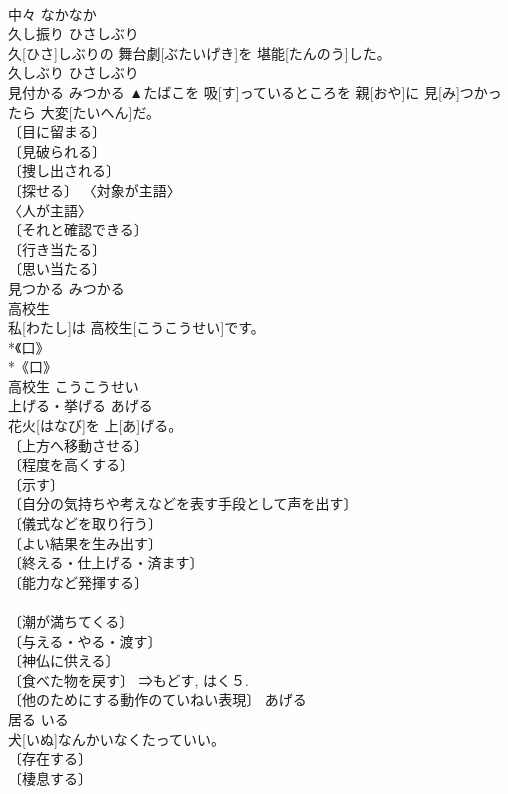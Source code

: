 \documentclass[8pt]{extreport}
\begin{document}
\begin{CJK}{UTF8}{min}
\\	中々	なかなか	
\\	久し振り	ひさしぶり	
\\	久[ひさ]しぶりの 舞台劇[ぶたいげき]を 堪能[たんのう]した。	
\\	久しぶり	ひさしぶり	
\\	見付かる	みつかる	▲たばこを 吸[す]っているところを 親[おや]に 見[み]つかったら 大変[たいへん]だ。	
\\	〔目に留まる〕 
\\	〔見破られる〕 
\\	〔捜し出される〕 
\\	〔探せる〕 〈対象が主語〉 
\\	〈人が主語〉 
\\	〔それと確認できる〕 
\\	〔行き当たる〕 
\\	〔思い当たる〕 
\\	見つかる	みつかる	
\\	高校生		
\\	私[わたし]は 高校生[こうこうせい]です。	
\\	*《口》 
\\	*《口》 
\\	高校生	こうこうせい	
\\	上げる・挙げる	あげる	
\\	花火[はなび]を 上[あ]げる。	
\\	〔上方へ移動させる〕 
\\	〔程度を高くする〕 
\\	〔示す〕 
\\	〔自分の気持ちや考えなどを表す手段として声を出す〕 
\\	〔儀式などを取り行う〕 
\\	〔よい結果を生み出す〕 
\\	〔終える・仕上げる・済ます〕 
\\	〔能力など発揮する〕 
\\	[⇒あげて] 
\\	〔潮が満ちてくる〕 
\\	〔与える・やる・渡す〕 
\\	〔神仏に供える〕 
\\	〔食べた物を戻す〕 ⇒もどす, はく５. 
\\	〔他のためにする動作のていねい表現〕		あげる	
\\	居る	いる	
\\	犬[いぬ]なんかいなくたっていい。	
\\	〔存在する〕 
\\	〔棲息する〕 

\end{CJK}
\end{document}
